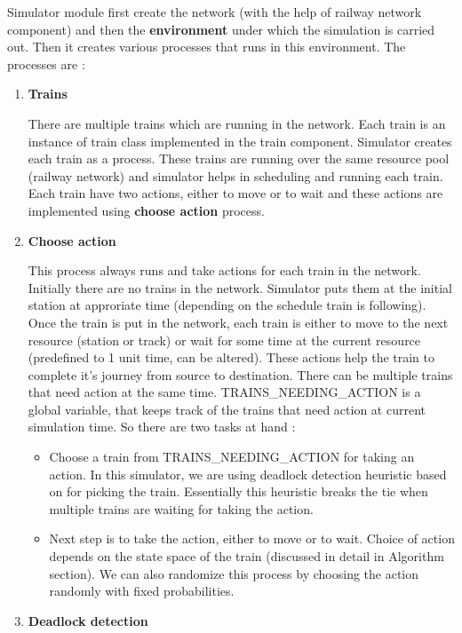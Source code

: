 Simulator module first create the network (with the help of railway network component) and then
the \textbf{environment} under which the simulation is carried out. Then it creates 
various processes that runs in this environment. The processes are : 
\begin{enumerate}
\item \textbf{Trains}

There are multiple trains which are running in the network. Each train is an instance of 
train class implemented in the train component. Simulator creates each train as a process. These
trains are running over the same resource pool (railway network) and simulator helps in scheduling and 
running each train. Each train have two actions, either to move or to wait and these 
actions are implemented using \textbf{choose action} process.

\item \textbf{Choose action}

This process always runs and take actions for each train in the network.
Initially there are no trains in the network. Simulator puts them at the initial station at approriate time 
(depending on the schedule train is following). Once the train is put in the network, each train is either to move to the next resource
(station or track) or wait for some time at the current resource (predefined to 1 unit time, can be altered). These actions
help the train to complete it's journey from source to destination.
There can be multiple trains that need action at the same time.
TRAINS\_NEEDING\_ACTION is a global variable, that keeps track of the trains that need action at current simulation
time. So there are two tasks at hand :
\begin{itemize}
\item Choose a train from TRAINS\_NEEDING\_ACTION for taking an action. In this simulator, we are 
    using deadlock detection heuristic based on \cite{ARTICLE:2} for picking the train. Essentially this heuristic breaks
    the tie when multiple trains are waiting for taking the action.

    \item Next step is to take the action, either to move or to wait. Choice of action depends on the state
    space of the train (discussed in detail in Algorithm section). We can also randomize this process by 
    choosing the action randomly with fixed probabilities.
\end{itemize}
\item \textbf{Deadlock detection}



\end{enumerate}

